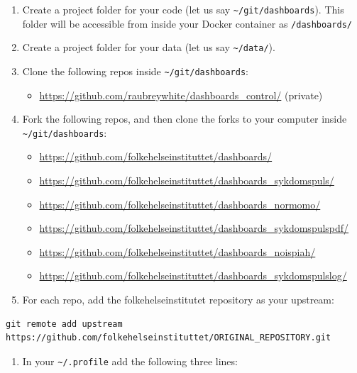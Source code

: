 \documentclass[12pt,]{article}
\providecommand{\tightlist}{%
  \setlength{\itemsep}{0pt}\setlength{\parskip}{0pt}}
\begin{document}
\begin{enumerate}
\def\labelenumi{\arabic{enumi}.}
\tightlist
\item
  Create a project folder for your code (let us say
  \texttt{\textasciitilde{}/git/dashboards}). This folder will be
  accessible from inside your Docker container as \texttt{/dashboards/}
\item
  Create a project folder for your data (let us say
  \texttt{\textasciitilde{}/data/}).
\item
  Clone the following repos inside
  \texttt{\textasciitilde{}/git/dashboards}:

  \begin{itemize}
  \tightlist
  \item
    \url{https://github.com/raubreywhite/dashboards_control/} (private)
  \end{itemize}
\item
  Fork the following repos, and then clone the forks to your computer
  inside \texttt{\textasciitilde{}/git/dashboards}:

  \begin{itemize}
  \tightlist
  \item
    \url{https://github.com/folkehelseinstituttet/dashboards/}
  \item
    \url{https://github.com/folkehelseinstituttet/dashboards_sykdomspuls/}
  \item
    \url{https://github.com/folkehelseinstituttet/dashboards_normomo/}
  \item
    \url{https://github.com/folkehelseinstituttet/dashboards_sykdomspulspdf/}
  \item
    \url{https://github.com/folkehelseinstituttet/dashboards_noispiah/}
  \item
    \url{https://github.com/folkehelseinstituttet/dashboards_sykdomspulslog/}
  \end{itemize}
\item
  For each repo, add the folkehelseinstitutet repository as your
  upstream:
\end{enumerate}

\begin{verbatim}
git remote add upstream https://github.com/folkehelseinstituttet/ORIGINAL_REPOSITORY.git
\end{verbatim}

\begin{enumerate}
\def\labelenumi{\arabic{enumi}.}
\setcounter{enumi}{5}
\tightlist
\item
  In your \texttt{\textasciitilde{}/.profile} add the following three
  lines:
\end{enumerate}
\end{document}
